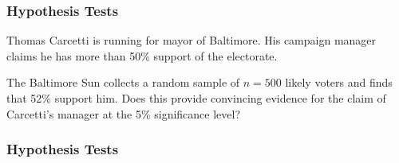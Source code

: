 \documentclass[slides]{beamer}
\newcommand{\blue}[1]{\textcolor{blue2}{#1}}
\newcommand{\phat}{\widehat{p}}
\begin{document}
\begin{frame}[fragile]
\frametitle{Hypothesis Tests}
Thomas Carcetti is running for mayor of Baltimore.  His campaign manager \blue{claims} he has more than 50\% support of the electorate.  

\vspace{0.5cm}

\pause The Baltimore Sun collects a random sample of $n=500$ likely voters and finds that 52\% support him.  Does this provide convincing evidence for the claim of Carcetti's manager at the 5\% significance level?

\end{frame}


\begin{frame}[fragile]
\frametitle{Hypothesis Tests}

%
%
%
%
%
%
%

\end{frame}
\end{document}
